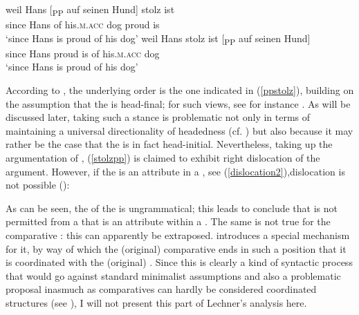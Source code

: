 \ea \label{ppstolzorder}
\ea	\gll weil Hans [\textsubscript{PP} auf seinen Hund] stolz ist \label{ppstolz}\\
since Hans \phantom{}	of his.\textsc{m.acc} dog proud is\\
\glt `since Hans is proud of his dog'
\ex	\gll weil Hans stolz ist [\textsubscript{PP} auf seinen Hund] \label{stolzpp}\\
since Hans proud is \phantom{} of his.\textsc{m.acc} dog\\
\glt `since Hans is proud of his dog'
\z
\z

According to \citet[26]{lechner2004}, the underlying order is the one indicated in (\ref{ppstolz}), building on the assumption that the  is head-final; for such views, see for instance \citet{haiderrosengren1998}.  As will be discussed later, taking such a stance is problematic not only in terms of maintaining a universal directionality of headedness (cf. \citealt{kayne1994}) but also because it may rather be the case that the   is in fact head-initial. Nevertheless, taking up the argumentation of \citet{lechner2004}, (\ref{stolzpp}) is claimed to exhibit right dislocation of the  argument. However, if the  is an attribute in a , see (\ref{dislocation2}),dislocation is not possible (\citealt[26, ex. 54]{lechner2004}):

\ea \label{dislocation2}
\z
\z

As can be seen, the  of the  is ungrammatical; this leads \citet[27]{lechner2004} to conclude that  is not permitted from a  that is an attribute within a . The same is not true for the comparative : this can apparently be extraposed. \citet{lechner1999diss, lechner2004} introduces a special mechanism for it, by way of which the (original) comparative  ends in such a position that it is coordinated with the (original) . Since this is clearly a kind of syntactic process that would go against standard minimalist assumptions and also a problematic proposal inasmuch as comparatives can hardly be considered coordinated structures (see \citealt{bacskaiatkari2010odd}), I will not present this part of Lechner's analysis here.


